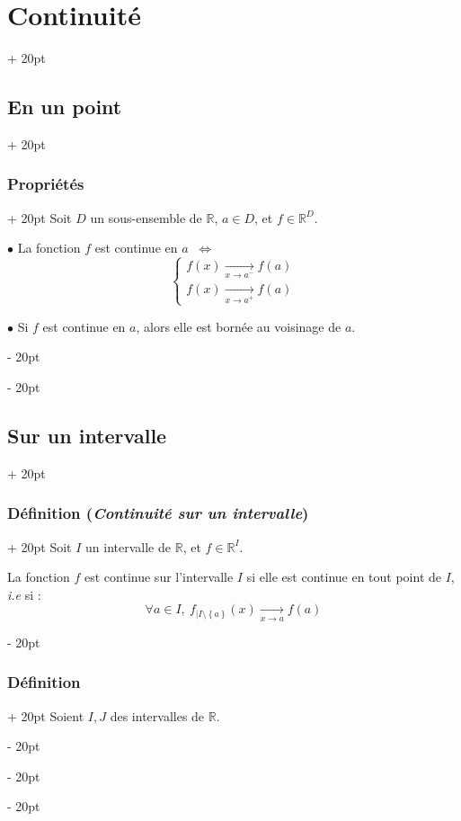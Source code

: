 \documentclass[a4paper, 12pt, twoside]{article}
\newcommand{\R}{\mathbb{R}} %
\newcommand{\tendsto}[1]{\xrightarrow[#1]{}}
\newcommand{\set}[1]{\left\{ #1 \right\}}
\newcommand{\ssi}{\ \Leftrightarrow \ }
\newcommand{\ind}[1][20pt]{\advance\leftskip + #1}
\newcommand{\deind}[1][20pt]{\advance\leftskip - #1}
\newenvironment{indt}[2][20pt]{#2 \par \ind[#1]}{\par \deind} %
\begin{document}
\begin{indt}{\section{Continuité}}
\begin{indt}{\subsection{En un point}}
            \vspace{12pt}
            
            \begin{indt}{\subsubsection{Propriétés}}
                Soit $D$ un sous-ensemble de $\R$, $a \in D$, et $f \in \R^D$.

                $\bullet$ La fonction $f$ est continue en $a$ $\ssi$
                \[
                    \begin{cases}
                        f(x) \tendsto{x \to a^-} f(a)
                        \\
                        f(x) \tendsto{x \to a^+} f(a)
                    \end{cases}
                \]

                $\bullet$ Si $f$ est continue en $a$, alors elle est bornée au voisinage de $a$.
            \end{indt}
        \end{indt}

        \vspace{12pt}
        
        \begin{indt}{\subsection{Sur un intervalle}}
            \begin{indt}{\subsubsection{Définition (\textit{Continuité sur un intervalle})}}
                Soit $I$ un intervalle de $\R$, et $f \in \R^I$.

                La fonction $f$ est continue sur l'intervalle $I$ si elle est continue en tout point de $I$, \textit{i.e} si :
                \[
                    \forall a \in I,\ f_{|I \setminus \set a}(x) \tendsto{x \to a} f(a)
                \]
            \end{indt}

            \vspace{12pt}
            
            \begin{indt}{\subsubsection{Définition}}
                Soient $I, J$ des intervalles de $\R$.


\end{indt}
\end{indt}
\end{indt}
\end{document}
